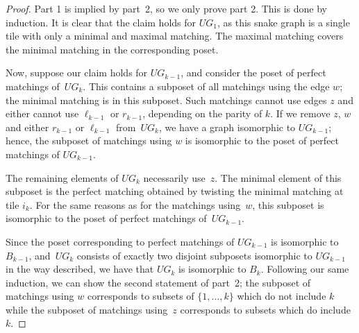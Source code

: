 \begin{proof}Part 1 is implied by part~2, so we only prove part 2. This is done by induction. It is clear that the claim holds for $UG_1$, as this snake graph is a single tile with only a minimal and maximal matching. The maximal matching covers the minimal matching in the corresponding poset.

Now, suppose our claim holds for $UG_{k-1}$, and consider the poset of perfect matchings of~$UG_k$. This contains a subposet of all matchings using the edge $w$; the minimal matching is in this subposet. Such matchings cannot use edges $z$ and either cannot use $\ell_{k-1}$ or $r_{k-1}$, depending on the parity of $k$. If we remove $z$, $w$ and either $r_{k-1}$ or $\ell_{k-1}$ from~$UG_k$, we have a graph isomorphic to $UG_{k-1}$; hence, the subposet of matchings using $w$ is isomorphic to the poset of perfect matchings of $UG_{k-1}$.

The remaining elements of $UG_{k}$ necessarily use~$z$. The minimal element of this subposet is the perfect matching obtained by twisting the minimal matching at tile $i_k$. For the same reasons as for the matchings using~$w$, this subposet is isomorphic to the poset of perfect matchings of~$UG_{k-1}$.

 Since the poset corresponding to perfect matchings of $UG_{k-1}$ is isomorphic to~$B_{k-1}$, and~$UG_k$ consists of exactly two disjoint subposets isomorphic to $UG_{k-1}$ in the way described, we have that $UG_k$ is isomorphic to $B_k$. Following our same induction, we can show the second statement of part~2; the subposet of matchings using $w$ corresponds to subsets of $\{1,\ldots, k\}$ which do not include $k$ while the subposet of matchings using~$z$ corresponds to subsets which do include~$k$.
\end{proof}

